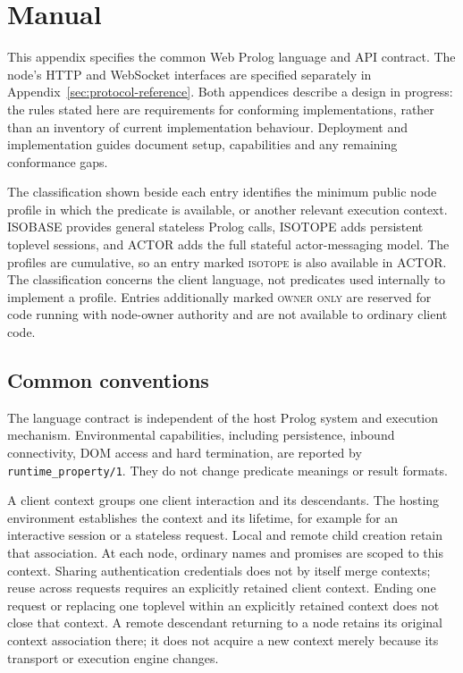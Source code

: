 \chapter{Manual}\label{sec:manual}

\begingroup
\setlength{\emergencystretch}{1.5em}

\vspace{10mm}
This appendix specifies the common Web Prolog language and API contract.
The node's HTTP and WebSocket interfaces are specified separately in
Appendix~\ref{sec:protocol-reference}. Both appendices describe a design in
progress: the rules stated here are requirements for conforming
implementations, rather than an inventory of current implementation behaviour.
Deployment and implementation guides document setup, capabilities and any
remaining conformance gaps.

The classification shown beside each entry identifies the minimum public node
profile in which the predicate is available, or another relevant execution
context. ISOBASE provides general stateless Prolog calls, ISOTOPE adds
persistent toplevel sessions, and ACTOR adds the full stateful actor-messaging
model. The profiles are cumulative, so an entry marked \textsc{isotope} is
also available in ACTOR. The classification concerns the client language, not
predicates used internally to implement a profile. Entries additionally marked
\textsc{owner only} are reserved for code running with node-owner authority and
are not available to ordinary client code.

\section{Common conventions}\label{sec:manual-conventions}
The language contract is independent of the host Prolog system and execution
mechanism. Environmental capabilities, including persistence, inbound
connectivity, DOM access and hard termination, are reported by
\texttt{runtime\_property/1}. They do not change predicate meanings or result
formats.

A client context groups one client interaction and its descendants. The
hosting environment establishes the context and its lifetime, for example
for an interactive session or a stateless request. Local and remote child
creation retain that association. At each node, ordinary names and promises
are scoped to this context. Sharing authentication credentials does not by itself merge
contexts; reuse across requests requires an explicitly retained client
context. Ending one request or replacing one toplevel within an explicitly
retained context does not close that context. A remote descendant returning to
a node retains its original context association there; it does not acquire a
new context merely because its transport or execution engine changes.

